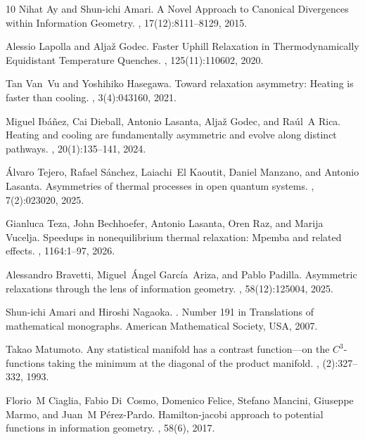 \documentclass{amsart}
\theoremstyle{definition}
\begin{document}
\begin{thebibliography}{10}
Nihat Ay and Shun-ichi Amari.
\newblock A {Novel} {Approach} to {Canonical} {Divergences} within
  {Information} {Geometry}.
, 17(12):8111--8129, 2015.

Alessio Lapolla and Aljaž Godec.
\newblock Faster {Uphill} {Relaxation} in {Thermodynamically} {Equidistant}
  {Temperature} {Quenches}.
, 125(11):110602, 2020.

Tan Van~Vu and Yoshihiko Hasegawa.
\newblock Toward relaxation asymmetry: Heating is faster than cooling.
, 3(4):043160, 2021.

Miguel Ib{\'a}{\~n}ez, Cai Dieball, Antonio Lasanta, Alja{\v{z}} Godec, and
  Ra{\'u}l~A Rica.
\newblock Heating and cooling are fundamentally asymmetric and evolve along
  distinct pathways.
, 20(1):135--141, 2024.

{\'A}lvaro Tejero, Rafael S{\'a}nchez, Laiachi~El Kaoutit, Daniel Manzano, and
  Antonio Lasanta.
\newblock Asymmetries of thermal processes in open quantum systems.
, 7(2):023020, 2025.

Gianluca Teza, John Bechhoefer, Antonio Lasanta, Oren Raz, and Marija Vucelja.
\newblock Speedups in nonequilibrium thermal relaxation: Mpemba and related
  effects.
, 1164:1--97, 2026.

Alessandro Bravetti, Miguel~Ángel García~Ariza, and Pablo Padilla.
\newblock Asymmetric relaxations through the lens of information geometry.
,
  58(12):125004, 2025.

Shun-ichi Amari and Hiroshi Nagaoka.
.
\newblock Number 191 in Translations of mathematical monographs. American
  Mathematical Society, USA, 2007.

Takao Matumoto.
\newblock Any statistical manifold has a contrast function---on the
  ${C}^3$-functions taking the minimum at the diagonal of the product manifold.
, (2):327--332, 1993.

Florio~M Ciaglia, Fabio Di~Cosmo, Domenico Felice, Stefano Mancini, Giuseppe
  Marmo, and Juan~M P{\'e}rez-Pardo.
\newblock Hamilton-jacobi approach to potential functions in information
  geometry.
, 58(6), 2017.


\end{thebibliography}
\end{document}
